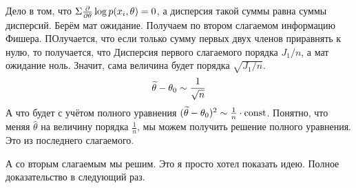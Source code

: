 Дело в том, что $\Sigma\frac{\partial  }{\partial \theta}\log p(x_i,\theta) = 0$, а дисперсия такой суммы равна суммы дисперсий.
Берём мат ожидание. Получаем по втором слагаемом информацию Фишера. ПОлучается, что если только сумму первых двух членов приравнять к нулю, то получается, что
Дисперсия первого слагаемого порядка $J_1/n$, а мат ожидание ноль. Значит, сама величина будет порядка $\sqrt{J_1/n}$.
\[
  \widetilde{\theta}{} - \theta_0\sim\frac1{\sqrt{n}}
\]
А что будет с учётом полного уравнения $(\widetilde{\theta}{}-\theta_0)^2 \sim \frac1n\cdot \operatorname{const}$. Понятно, что меняя $\hat\theta$ на величину порядка $\frac1n$, мы можем получить решение полного уравнения. Это из последнего слагаемого.

А со вторым слагаемым мы решим. Это я просто хотел показать идею. Полное доказательство в следующий раз.
